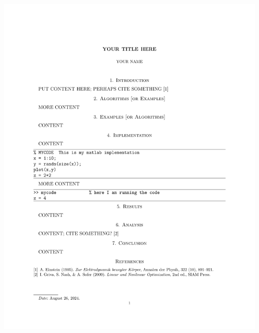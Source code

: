 \documentclass[12pt]{amsart}
\begin{document}
\includegraphics[height=\textheight]{blank.pdf}
\end{document}
